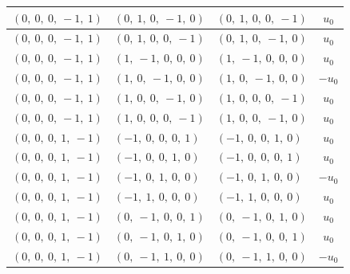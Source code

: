 \documentclass[11pt]{article}
\theoremstyle{definition}
\begin{document}
\begin{longtable}{|l|l|l|c|}
    \hline
    $\left( 0, \  0, \  0, \  -1, \  1\right)$ & $\left( 0, \  1, \  0, \  -1, \  0\right)$ & $\left( 0, \  1, \  0, \  0, \  -1\right)$ & $u_{0}$ \\
    \hline
    $\left( 0, \  0, \  0, \  -1, \  1\right)$ & $\left( 0, \  1, \  0, \  0, \  -1\right)$ & $\left( 0, \  1, \  0, \  -1, \  0\right)$ & $u_{0}$ \\
    \hline
    $\left( 0, \  0, \  0, \  -1, \  1\right)$ & $\left( 1, \  -1, \  0, \  0, \  0\right)$ & $\left( 1, \  -1, \  0, \  0, \  0\right)$ & $u_{0}$ \\
    \hline
    $\left( 0, \  0, \  0, \  -1, \  1\right)$ & $\left( 1, \  0, \  -1, \  0, \  0\right)$ & $\left( 1, \  0, \  -1, \  0, \  0\right)$ & $- u_{0}$ \\
    \hline
    $\left( 0, \  0, \  0, \  -1, \  1\right)$ & $\left( 1, \  0, \  0, \  -1, \  0\right)$ & $\left( 1, \  0, \  0, \  0, \  -1\right)$ & $u_{0}$ \\
    \hline
    $\left( 0, \  0, \  0, \  -1, \  1\right)$ & $\left( 1, \  0, \  0, \  0, \  -1\right)$ & $\left( 1, \  0, \  0, \  -1, \  0\right)$ & $u_{0}$ \\
    \hline
    $\left( 0, \  0, \  0, \  1, \  -1\right)$ & $\left( -1, \  0, \  0, \  0, \  1\right)$ & $\left( -1, \  0, \  0, \  1, \  0\right)$ & $u_{0}$ \\
    \hline
    $\left( 0, \  0, \  0, \  1, \  -1\right)$ & $\left( -1, \  0, \  0, \  1, \  0\right)$ & $\left( -1, \  0, \  0, \  0, \  1\right)$ & $u_{0}$ \\
    \hline
    $\left( 0, \  0, \  0, \  1, \  -1\right)$ & $\left( -1, \  0, \  1, \  0, \  0\right)$ & $\left( -1, \  0, \  1, \  0, \  0\right)$ & $- u_{0}$ \\
    \hline
    $\left( 0, \  0, \  0, \  1, \  -1\right)$ & $\left( -1, \  1, \  0, \  0, \  0\right)$ & $\left( -1, \  1, \  0, \  0, \  0\right)$ & $u_{0}$ \\
    \hline
    $\left( 0, \  0, \  0, \  1, \  -1\right)$ & $\left( 0, \  -1, \  0, \  0, \  1\right)$ & $\left( 0, \  -1, \  0, \  1, \  0\right)$ & $u_{0}$ \\
    \hline
    $\left( 0, \  0, \  0, \  1, \  -1\right)$ & $\left( 0, \  -1, \  0, \  1, \  0\right)$ & $\left( 0, \  -1, \  0, \  0, \  1\right)$ & $u_{0}$ \\
    \hline
    $\left( 0, \  0, \  0, \  1, \  -1\right)$ & $\left( 0, \  -1, \  1, \  0, \  0\right)$ & $\left( 0, \  -1, \  1, \  0, \  0\right)$ & $- u_{0}$ \\

\end{longtable}
\end{document}
